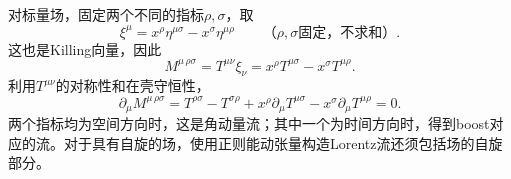 \begin{example}[旋转与Lorentz变换]
    对标量场，固定两个不同的指标$\rho,\sigma$，取
    \begin{equation}
        \xi^\mu=x^\rho\eta^{\mu\sigma}-x^\sigma\eta^{\mu\rho}
        \qquad\text{（$\rho,\sigma$固定，不求和）}.
    \end{equation}
    这也是Killing向量，因此
    \begin{equation}
        M^{\mu\,\rho\sigma}=T^{\mu\nu}\xi_\nu
        =x^\rho T^{\mu\sigma}-x^\sigma T^{\mu\rho}.
    \end{equation}
    利用$T^{\mu\nu}$的对称性和在壳守恒性，
    \begin{equation}
        \partial_\mu M^{\mu\,\rho\sigma}
        =T^{\rho\sigma}-T^{\sigma\rho}
        +x^\rho\partial_\mu T^{\mu\sigma}
        -x^\sigma\partial_\mu T^{\mu\rho}=0.
    \end{equation}
    两个指标均为空间方向时，这是角动量流；其中一个为时间方向时，得到boost对应的流。对于具有自旋的场，使用正则能动张量构造Lorentz流还须包括场的自旋部分。
\end{example}
